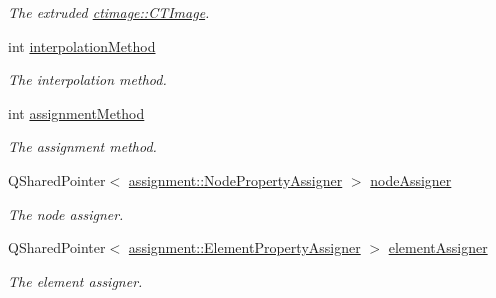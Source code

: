 \begin{DoxyCompactItemize}
\begin{DoxyCompactList}\small\item\em The extruded \hyperlink{classctimage_1_1_c_t_image}{ctimage::CTImage}. \item\end{DoxyCompactList}\item 
\hypertarget{classgui_1_1_main_window_aebdf130c1f7a497215c52bad94d71975}{
int \hyperlink{classgui_1_1_main_window_aebdf130c1f7a497215c52bad94d71975}{interpolationMethod}}
\label{classgui_1_1_main_window_aebdf130c1f7a497215c52bad94d71975}

\begin{DoxyCompactList}\small\item\em The interpolation method. \item\end{DoxyCompactList}\item 
\hypertarget{classgui_1_1_main_window_ab4cab84ee3d3b9318a129ba7f456837c}{
int \hyperlink{classgui_1_1_main_window_ab4cab84ee3d3b9318a129ba7f456837c}{assignmentMethod}}
\label{classgui_1_1_main_window_ab4cab84ee3d3b9318a129ba7f456837c}

\begin{DoxyCompactList}\small\item\em The assignment method. \item\end{DoxyCompactList}\item 
\hypertarget{classgui_1_1_main_window_ad1fbd0a0da67c0e8f3378ee0415dfaa1}{
QSharedPointer$<$ \hyperlink{classassignment_1_1_node_property_assigner}{assignment::NodePropertyAssigner} $>$ \hyperlink{classgui_1_1_main_window_ad1fbd0a0da67c0e8f3378ee0415dfaa1}{nodeAssigner}}
\label{classgui_1_1_main_window_ad1fbd0a0da67c0e8f3378ee0415dfaa1}

\begin{DoxyCompactList}\small\item\em The node assigner. \item\end{DoxyCompactList}\item 
\hypertarget{classgui_1_1_main_window_a2f296c603ff5f915b6023370fb87acfd}{
QSharedPointer$<$ \hyperlink{classassignment_1_1_element_property_assigner}{assignment::ElementPropertyAssigner} $>$ \hyperlink{classgui_1_1_main_window_a2f296c603ff5f915b6023370fb87acfd}{elementAssigner}}
\label{classgui_1_1_main_window_a2f296c603ff5f915b6023370fb87acfd}

\begin{DoxyCompactList}\small\item\em The element assigner. \item\end{DoxyCompactList}\end{DoxyCompactItemize}


